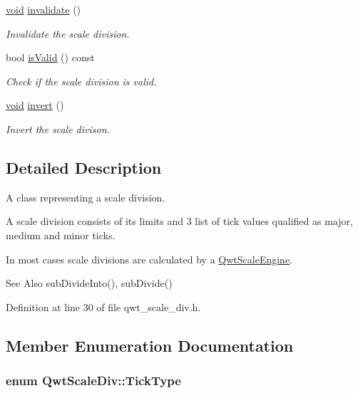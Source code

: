 \begin{DoxyCompactItemize}
\item 
\hyperlink{group___u_a_v_objects_plugin_ga444cf2ff3f0ecbe028adce838d373f5c}{void} \hyperlink{class_qwt_scale_div_a429d3b6004f06c59530c084a9aecf2bb}{invalidate} ()
\begin{DoxyCompactList}\small\item\em Invalidate the scale division. \end{DoxyCompactList}\item 
bool \hyperlink{class_qwt_scale_div_a22f6955b5d2c73a91a8f01ad49cd4c39}{is\-Valid} () const 
\begin{DoxyCompactList}\small\item\em Check if the scale division is valid. \end{DoxyCompactList}\item 
\hyperlink{group___u_a_v_objects_plugin_ga444cf2ff3f0ecbe028adce838d373f5c}{void} \hyperlink{class_qwt_scale_div_a1ea38d52d5836fd4376f480180973786}{invert} ()
\begin{DoxyCompactList}\small\item\em Invert the scale divison. \end{DoxyCompactList}\end{DoxyCompactItemize}


\subsection{Detailed Description}
A class representing a scale division. 

A scale division consists of its limits and 3 list of tick values qualified as major, medium and minor ticks.

In most cases scale divisions are calculated by a \hyperlink{class_qwt_scale_engine}{Qwt\-Scale\-Engine}.

\begin{DoxySeeAlso}{See Also}
sub\-Divide\-Into(), sub\-Divide() 
\end{DoxySeeAlso}


Definition at line 30 of file qwt\-\_\-scale\-\_\-div.\-h.



\subsection{Member Enumeration Documentation}
\hypertarget{class_qwt_scale_div_af21aedaa886dd5e067cf63505838736c}{
\subsubsection[{Tick\-Type}]{\setlength{\rightskip}{0pt plus 5cm}enum {\bf Qwt\-Scale\-Div\-::\-Tick\-Type}}}\label{class_qwt_scale_div_af21aedaa886dd5e067cf63505838736c}



